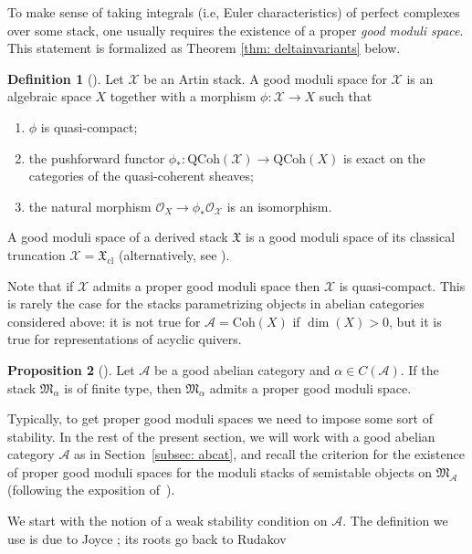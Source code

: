 \documentclass[12pt]{amsart}
\theoremstyle{definition}
\newtheorem{definition}{Definition}[section]
\newtheorem{proposition}[definition]{Proposition}
\newcommand{\CA}{{\mathcal A}}
\newcommand{\CX}{{\mathcal X}}
\newcommand{\1}{\mathbf 1}
\newcommand{\FM}{{\mathfrak{M}}}
\newcommand{\FX}{{\mathfrak{X}}}
\newcommand{\Coh}{\mathrm{Coh}}
\newcommand{\QCoh}{\mathrm{QCoh}}
\newcommand{\cl}{\mathrm{cl}}
\begin{document}
To make sense of taking integrals (i.e, Euler characteristics) of perfect complexes over some stack, one usually requires the existence of a proper \textit{good moduli space}. This statement is formalized as Theorem \ref{thm: deltainvariants} below.

\begin{definition}[\cite{alper}] Let $\CX$ be an Artin stack. A good moduli space for $\CX$ is an algebraic space $X$ together with a morphism $\phi: \CX \to X$ such that
\begin{enumerate}
\item $\phi$ is quasi-compact;
\item the pushforward functor $\phi_*\colon \QCoh(\CX) \to \QCoh(X)$ is exact on the categories of the quasi-coherent sheaves;
\item the natural morphism $\mathcal O_{X} \to \phi_*\mathcal O_\CX$ is an isomorphism.
\end{enumerate}
A good moduli space of a derived stack $\FX$ is a good moduli space of its classical truncation $\CX=\FX_\cl$ (alternatively, see \cite{ahps}).
\end{definition}

Note that if $\CX$ admits a proper good moduli space then $\CX$ is quasi-compact. This is rarely the case for the stacks parametrizing objects in abelian categories considered above: it is not true for $\CA=\Coh(X)$ if $\dim(X)>0$, but it is true for representations of acyclic quivers. 

\begin{proposition}[{\cite[Theorem 7.23]{AHLH}}]\label{prop: existencegoodmoduli1}
    Let $\CA$ be a good abelian category and $\alpha\in C(\CA)$. If the stack $\FM_{\alpha}$ is of finite type, then $\FM_\alpha$ admits a proper good moduli space.
\end{proposition}


Typically, to get proper good moduli spaces we need to impose some sort of stability. In the rest of the present section, we will  work with a good abelian category $\mathcal A$ as in Section~\ref{subsec: abcat}, and recall the criterion for the existence of proper good moduli spaces for the moduli stacks of semistable objects on $\FM_{\mathcal A}$ (following the exposition of~\cite[Subsection 3.1]{joyce}).

We start with the notion of a weak stability condition on $\mathcal A$. The definition we use is due to Joyce \cite{JO06III};  its roots go back to Rudakov~\cite{rudakov}
\end{document}
